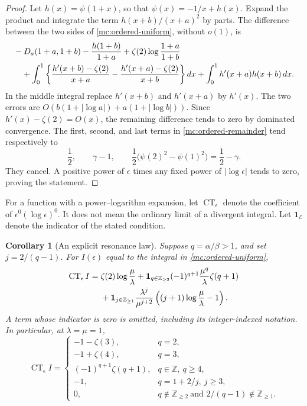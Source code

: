\documentclass[11pt,a4paper]{article}
\numberwithin{equation}{section}
\newtheorem{corollary}[theorem]{Corollary}
\theoremstyle{definition}
\theoremstyle{remark}
\begin{document}
\begin{proof}
Let $h(x)=\psi(1+x)$, so that $\psi(x)=-1/x+h(x)$.
Expand the product and integrate the term
$h(x+b)/(x+a)^2$ by parts. The difference between the two sides of
\eqref{mc:ordered-uniform}, without $o(1)$, is
\begin{align}\label{mc:ordered-remainder}
 &-D_a(1+a,1+b)-\frac{h(1+b)}{1+a}
     +\zeta(2)\log\frac{1+a}{1+b}\notag\\
 &\quad+\int_0^1\left\{
       \frac{h'(x+b)-\zeta(2)}{x+a}
      -\frac{h'(x+a)-\zeta(2)}{x+b}\right\}dx
      +\int_0^1h'(x+a)h(x+b)\,dx.
\end{align}
In the middle integral replace $h'(x+b)$ and $h'(x+a)$ by
$h'(x)$. The two errors are
$O(b(1+|\log a|)+a(1+|\log b|))$.
Since $h'(x)-\zeta(2)=O(x)$, the remaining difference tends to
zero by dominated convergence. The first, second, and last terms
in \eqref{mc:ordered-remainder} tend respectively to
\[
 \frac12,\qquad \gamma-1,\qquad
 \frac12\bigl(\psi(2)^2-\psi(1)^2\bigr)=\frac12-\gamma.
\]
They cancel. A positive power of $\epsilon$ times any fixed power
of $|\log\epsilon|$ tends to zero, proving the statement.
\end{proof}

For a function with a power--logarithm expansion, let
$\operatorname{CT}_{\epsilon}$ denote the coefficient of
$\epsilon^0(\log\epsilon)^0$. It does not mean the ordinary limit
of a divergent integral. Let $\mathbf1_{\mathcal E}$ denote the
indicator of the stated condition.

\begin{corollary}[An explicit resonance law]\label{mc:ordered-CT}
Suppose $q=\alpha/\beta>1$, and set $j=2/(q-1)$.
For $I(\epsilon)$ equal to the integral in
\eqref{mc:ordered-uniform},
\begin{align}\label{mc:ordered-constant}
 \operatorname{CT}_{\epsilon}I
 ={}&\zeta(2)\log\frac\mu\lambda
  +\mathbf1_{q\in\mathbb Z_{\ge2}}
       (-1)^{q+1}\frac{\mu^q}{\lambda}\zeta(q+1)\notag\\
 &+\mathbf1_{j\in\mathbb Z_{\ge1}}
       \frac{\lambda^j}{\mu^{j+2}}
                  \left((j+1)\log\frac\mu\lambda-1\right).
\end{align}
A term whose indicator is zero is omitted, including its
integer-indexed notation. In particular, at $\lambda=\mu=1$,
\begin{equation}\label{mc:ordered-examples}
 \operatorname{CT}_{\epsilon}I=
 \begin{cases}
  -1-\zeta(3),&q=2,\\
  -1+\zeta(4),&q=3,\\
  (-1)^{q+1}\zeta(q+1),&q\in\mathbb Z,\ q\ge4,\\
  -1,&q=1+2/j,\ j\ge3,\\
  0,&q\notin\mathbb Z_{\ge2}\ \text{and }2/(q-1)\notin\mathbb Z_{\ge1}.
 \end{cases}
\end{equation}
\end{corollary}
\end{document}
